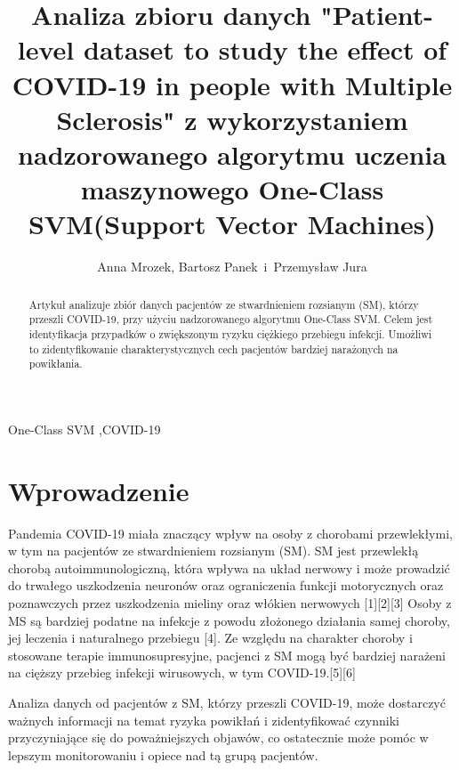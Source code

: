 \documentclass[a4paper,fleqn]{cas-dc}
\begin{document}
\let\WriteBookmarks\relax
\def\floatpagepagefraction{1}
\def\textpagefraction{.001}


\shortauthors{}

\title [mode = title]{Analiza zbioru danych "Patient-level dataset to study the effect of COVID-19 in people with Multiple Sclerosis" z wykorzystaniem nadzorowanego algorytmu uczenia maszynowego One-Class SVM(Support Vector Machines)}                      

\author{Anna Mrozek, Bartosz Panek \,i\, Przemysław Jura  }

\renewcommand{\abstractname}{STRESZCZENIE}
\begin{abstract}
Artykuł analizuje zbiór danych pacjentów ze stwardnieniem rozsianym (SM), którzy przeszli COVID-19, przy użyciu nadzorowanego algorytmu One-Class SVM. Celem jest identyfikacja przypadków o zwiększonym ryzyku ciężkiego przebiegu infekcji. Umożliwi to zidentyfikowanie charakterystycznych cech pacjentów bardziej narażonych na powikłania.
\end{abstract}

\renewcommand{\abstractname}{STRESZCZENIE}
\begin{keywords}
One-Class SVM \sep COVID-19 
\end{keywords}

\maketitle

\section{Wprowadzenie}
Pandemia COVID-19 miała znaczący wpływ na osoby z chorobami przewlekłymi, w tym na pacjentów ze stwardnieniem rozsianym (SM). SM jest przewlekłą chorobą autoimmunologiczną, która wpływa na układ nerwowy i może prowadzić do trwałego uszkodzenia neuronów oraz ograniczenia funkcji motorycznych oraz poznawczych przez uszkodzenia mieliny oraz włókien nerwowych [1][2][3] Osoby z MS są bardziej podatne na infekcje z powodu złożonego działania samej choroby, jej leczenia i naturalnego przebiegu [4].  Ze względu na charakter choroby i stosowane terapie immunosupresyjne, pacjenci z SM mogą być bardziej narażeni na cięższy przebieg infekcji wirusowych, w tym COVID-19.[5][6] 

Analiza danych od pacjentów z SM, którzy przeszli COVID-19, może dostarczyć ważnych informacji na temat ryzyka powikłań i zidentyfikować czynniki przyczyniające się do poważniejszych objawów, co ostatecznie może pomóc w lepszym monitorowaniu i opiece nad tą grupą pacjentów.
\end{document}
